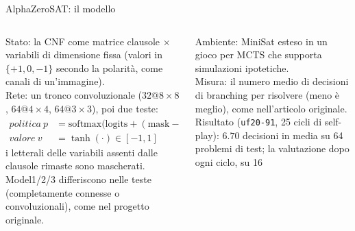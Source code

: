 \documentclass[aspectratio=169]{beamer}
\newcommand{\T}[2]{#2}
\newcommand{\T}[2]{#1}
\begin{document}
\begin{frame}{\T{AlphaZeroSAT: the model}{AlphaZeroSAT: il modello}}
  \begin{columns}[t]
    \begin{column}{0.56\textwidth}
      \footnotesize
      \T{State: the CNF as a fixed-size clauses $\times$ variables matrix (entries in
      $\{+1,0,-1\}$ by polarity, as image channels).}%
      {Stato: la CNF come matrice clausole $\times$ variabili di dimensione fissa (valori in
      $\{+1,0,-1\}$ secondo la polarit\`a, come canali di un'immagine).}\\[1mm]
      \T{Network: a convolutional trunk ($32@8{\times}8$, $64@4{\times}4$, $64@3{\times}3$),
      then two heads:}{Rete: un tronco convoluzionale ($32@8{\times}8$, $64@4{\times}4$,
      $64@3{\times}3$), poi due teste:}
      \begin{align*}
        \T{policy}{politica}\ p &= \text{softmax}\big(\text{logits} + (\text{mask}-1)\!\cdot\!\infty\big)\in\Delta^{2n}\\
        \T{value}{valore}\ v &= \tanh(\cdot)\in[-1,1]
      \end{align*}
      \T{the literals of the variables absent from the remaining clauses are masked.}%
      {i letterali delle variabili assenti dalle clausole rimaste sono mascherati.}\\[1mm]
      \T{Model1/2/3 differ in the heads (fully connected or convolutional), as in the
      original design.}{Model1/2/3 differiscono nelle teste (completamente connesse o
      convoluzionali), come nel progetto originale.}
    \end{column}
    \begin{column}{0.44\textwidth}
      \footnotesize
      \T{Environment: MiniSat extended into an MCTS game that supports hypothetical
      simulations.}{Ambiente: MiniSat esteso in un gioco per MCTS che supporta simulazioni
      ipotetiche.}\\[2mm]
      \T{Measure: the mean number of branching decisions to solve (lower is better), as in
      the original paper.}{Misura: il numero medio di decisioni di branching per risolvere
      (meno \`e meglio), come nell'articolo originale.}\\[1mm]
      \T{Result (\texttt{uf20-91}, 25 cycles of self-play): $6.70$ mean decisions on 64 test
      problems; the evaluation after each cycle, on 16 problems, ranges from $3.4$ to $9.4$,
      too noisy to show a trend.}{Risultato (\texttt{uf20-91}, 25 cicli di self-play): $6.70$
      decisioni in media su 64 problemi di test; la valutazione dopo ogni ciclo, su 16
}
\end{column}
\end{columns}
\end{frame}
\end{document}
